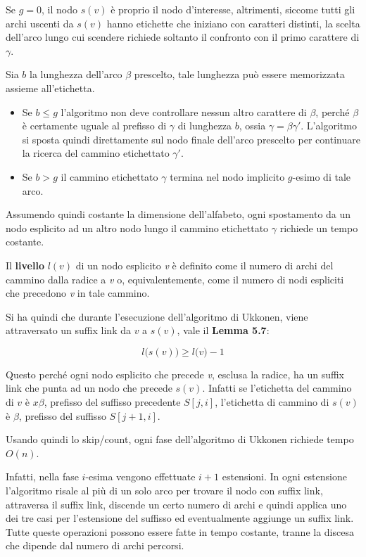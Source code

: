 Se $g = 0$, il nodo $s(v)$ è proprio il nodo d'interesse, altrimenti, siccome tutti gli archi uscenti da $s(v)$ hanno etichette che iniziano con caratteri distinti, la scelta dell'arco lungo cui scendere richiede soltanto il confronto con il primo carattere di $\gamma$.

Sia $b$ la lunghezza dell'arco $\beta$ prescelto, tale lunghezza può essere memorizzata assieme all'etichetta.

\begin{itemize}
\item Se $b \leq g$ l'algoritmo non deve controllare nessun altro carattere di $\beta$, perché $\beta$ è certamente uguale al prefisso di $\gamma$ di lunghezza $b$, ossia $\gamma = \beta\gamma'$. L'algoritmo si sposta quindi direttamente sul nodo finale dell'arco prescelto per continuare la ricerca del cammino etichettato $\gamma'$.
\item Se $b > g$ il cammino etichettato $\gamma$ termina nel nodo implicito $g$-esimo di tale arco.
\end{itemize}

Assumendo quindi costante la dimensione dell'alfabeto, ogni spostamento da un nodo esplicito ad un altro nodo lungo il cammino etichettato $\gamma$ richiede un tempo costante.

Il \textbf{livello} $l(v)$ di un nodo esplicito \textit{v} è definito come il numero di archi del cammino dalla radice a \textit{v} o, equivalentemente, come il numero di nodi espliciti che precedono \textit{v} in tale cammino.

Si ha quindi che durante l'esecuzione dell'algoritmo di Ukkonen, viene attraversato un suffix link da $v$ a $s(v)$, vale il \textbf{Lemma 5.7}:

$$
l\big(s(v)\big) \geq l\big(v\big) -1
$$

Questo perché ogni nodo esplicito che precede \textit{v}, esclusa la radice, ha un suffix link che punta ad un nodo che precede $s(v)$. Infatti se l'etichetta del cammino di $v$ è $x\beta$, prefisso del suffisso precedente $S[j,i]$, l'etichetta di cammino di $s(v)$ è $\beta$, prefisso del suffisso $S[j+1,i]$.

Usando quindi lo skip/count, ogni fase dell'algoritmo di Ukkonen richiede tempo $O(n)$.

Infatti, nella fase $i$-esima vengono effettuate $i+1$ estensioni. In ogni estensione l'algoritmo risale al più di un solo arco per trovare il nodo con suffix link, attraversa il suffix link, discende un certo numero di archi e quindi applica uno dei tre casi per l'estensione del suffisso ed eventualmente aggiunge un suffix link. Tutte queste operazioni possono essere fatte in tempo costante, tranne la discesa che dipende dal numero di archi percorsi.

